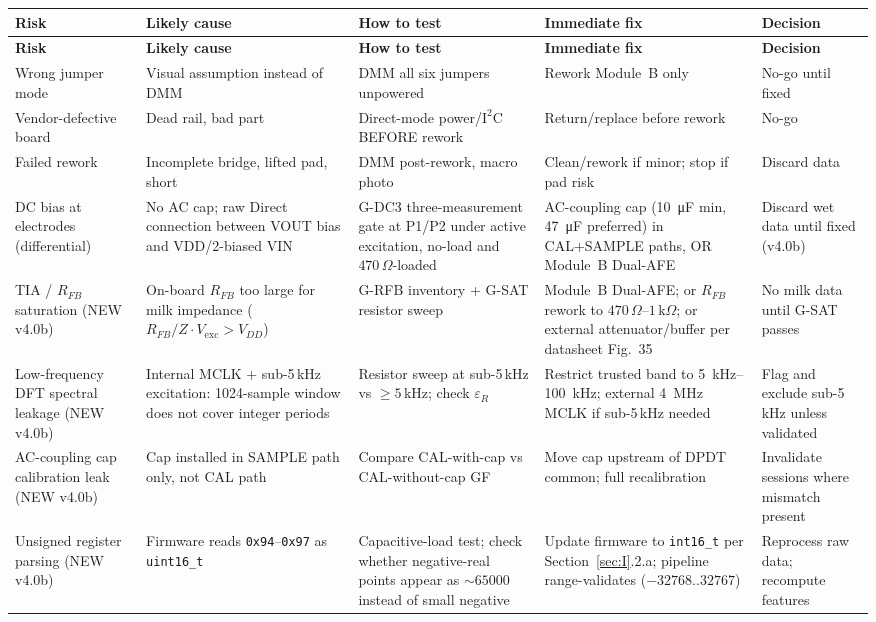 \documentclass[11pt,a4paper]{article}
\newcommand{\kohm}[1]{\ensuremath{#1\,\mathrm{k}\Omega}}
\newcommand{\Rohm}[1]{\ensuremath{#1\,\Omega}}
\begin{document}
\scriptsize
\begin{xltabular}{\textwidth}{L{26mm}L{31mm}L{29mm}L{31mm}L{18mm}}
\toprule
\textbf{Risk} & \textbf{Likely cause} & \textbf{How to test} & \textbf{Immediate fix} & \textbf{Decision}\\
\midrule
\endfirsthead
\toprule
\textbf{Risk} & \textbf{Likely cause} & \textbf{How to test} & \textbf{Immediate fix} & \textbf{Decision}\\
\midrule
\endhead

Wrong jumper mode & Visual assumption instead of DMM & DMM all six jumpers unpowered & Rework Module~B only & No-go until fixed\\
Vendor-defective board & Dead rail, bad part & Direct-mode power/$\mathrm{I^2C}$ BEFORE rework & Return/replace before rework & No-go\\
Failed rework & Incomplete bridge, lifted pad, short & DMM post-rework, macro photo & Clean/rework if minor; stop if pad risk & Discard data\\
DC bias at electrodes (differential) & No AC cap; raw Direct connection between VOUT bias and VDD/2-biased VIN & G-DC3 three-measurement gate at P1/P2 under active excitation, no-load and \Rohm{470}-loaded & AC-coupling cap (\SI{10}{\micro\farad} min, \SI{47}{\micro\farad} preferred) in CAL+SAMPLE paths, OR Module~B Dual-AFE & Discard wet data until fixed (v4.0b)\\
TIA / $R_{FB}$ saturation (NEW v4.0b) & On-board $R_{FB}$ too large for milk impedance ($R_{FB}/Z \cdot V_\mathrm{exc} > V_{DD}$) & G-RFB inventory + G-SAT resistor sweep & Module~B Dual-AFE; or $R_{FB}$ rework to \Rohm{470}--\kohm{1}; or external attenuator/buffer per datasheet Fig.~35 & No milk data until G-SAT passes\\
Low-frequency DFT spectral leakage (NEW v4.0b) & Internal MCLK + sub-5\,kHz excitation: 1024-sample window does not cover integer periods & Resistor sweep at sub-5\,kHz vs $\geq\!5\,$kHz; check $\varepsilon_R$ & Restrict trusted band to \SIrange{5}{100}{\kilo\hertz}; external \SI{4}{\mega\hertz} MCLK if sub-5\,kHz needed & Flag and exclude sub-5\,kHz unless validated\\
AC-coupling cap calibration leak (NEW v4.0b) & Cap installed in SAMPLE path only, not CAL path & Compare CAL-with-cap vs CAL-without-cap GF & Move cap upstream of DPDT common; full recalibration & Invalidate sessions where mismatch present\\
Unsigned register parsing (NEW v4.0b) & Firmware reads \texttt{0x94}--\texttt{0x97} as \texttt{uint16\_t} & Capacitive-load test; check whether negative-real points appear as $\sim\!65000$ instead of small negative & Update firmware to \texttt{int16\_t} per Section~\ref{sec:I}.2.a; pipeline range-validates ($-32768$..$32767$) & Reprocess raw data; recompute features\\

\end{xltabular}
\end{document}
